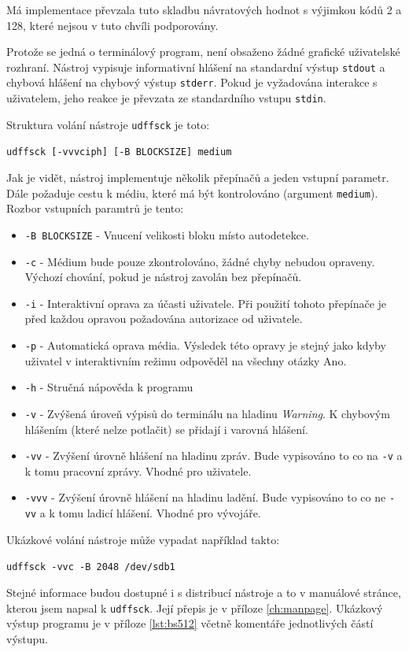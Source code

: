 Má implementace převzala tuto skladbu návratových hodnot s výjimkou kódů 2 a 128, které nejsou v tuto chvíli podporovány.

Protože se jedná o terminálový program, není obsaženo žádné grafické uživatelské rozhraní. Nástroj vypisuje informativní hlášení na standardní výstup \texttt{stdout} a chybová hlášení na chybový výstup \texttt{stderr}. Pokud je vyžadována interakce s uživatelem, jeho reakce je převzata ze standardního vstupu \texttt{stdin}.

Struktura volání nástroje \texttt{udffsck} je toto:

\centerline{\texttt{udffsck [-vvvciph] [-B BLOCKSIZE] medium}}

Jak je vidět, nástroj implementuje několik přepínačů a jeden vstupní parametr. Dále požaduje cestu k médiu, které má být kontrolováno (argument  \texttt{medium}). 
Rozbor vstupních paramtrů je tento:
\begin{itemize} 
    \item \texttt{-B BLOCKSIZE} - Vnucení velikosti bloku místo autodetekce.
    \item \texttt{-c} - Médium bude pouze zkontrolováno, žádné chyby nebudou opraveny. Výchozí chování, pokud je nástroj zavolán bez přepínačů.
    \item \texttt{-i} - Interaktivní oprava za účasti uživatele. Při použití tohoto přepínače je před každou opravou požadována autorizace od uživatele. 
    \item \texttt{-p} - Automatická oprava média. Výsledek této opravy je stejný jako kdyby uživatel v interaktivním režimu odpověděl na všechny otázky Ano.
    \item \texttt{-h} - Stručná nápověda k programu
    \item \texttt{-v} - Zvýšená úroveň výpisů do terminálu na hladinu \textit{Warning}. K chybovým hlášením (které nelze potlačit) se přidají i varovná hlášení.
    \item \texttt{-vv} - Zvýšení úrovně hlášení na hladinu zpráv. Bude vypisováno to co na \texttt{-v} a k tomu pracovní zprávy. Vhodné pro uživatele.
    \item \texttt{-vvv} - Zvýšení úrovně hlášení na hladinu ladění. Bude vypisováno to co ne \texttt{-vv} a k tomu ladicí hlášení. Vhodné pro vývojáře.
\end{itemize}
Ukázkové volání nástroje může vypadat například takto:

\centerline{\texttt{udffsck -vvc -B 2048 /dev/sdb1}}

Stejné informace budou dostupné i s distribucí nástroje a to v manuálové stránce, kterou jsem napsal k \texttt{udffsck}. Její přepis je v příloze \ref{ch:manpage}.
Ukázkový výstup programu je v příloze \ref{lst:bs512} včetně komentáře jednotlivých částí výstupu. 

